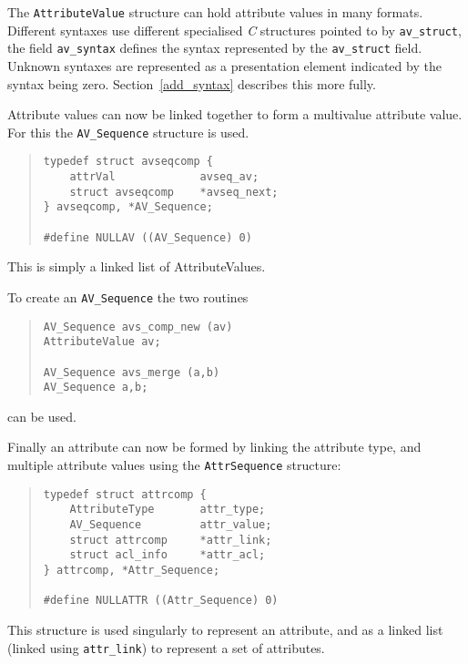 The \verb"AttributeValue" structure can hold attribute values in many
formats. Different syntaxes use different 
specialised {\em C\/} structures pointed to by
\verb"av_struct", the
field \verb"av_syntax" defines the syntax represented by the
\verb"av_struct" field.
Unknown syntaxes are represented as a presentation element
indicated by the syntax being zero.
Section~\ref{add_syntax} describes this more fully.


Attribute values can now be linked together to form a multivalue attribute
value.
For this the \verb"AV_Sequence" structure is used.

\begin{quote}\small\begin{verbatim}
typedef struct avseqcomp {     
    attrVal             avseq_av;
    struct avseqcomp    *avseq_next;
} avseqcomp, *AV_Sequence;

#define NULLAV ((AV_Sequence) 0)
\end{verbatim}\end{quote}

This is simply a linked list of AttributeValues.

To create an \verb"AV_Sequence" the two routines
\begin{quote}\small\begin{verbatim}
AV_Sequence avs_comp_new (av)
AttributeValue av;

AV_Sequence avs_merge (a,b)
AV_Sequence a,b;
\end{verbatim}\end{quote}
can be used.

Finally an attribute can now be formed by linking the attribute type, and
multiple attribute values using the \verb"AttrSequence" structure:

\begin{quote}\small\begin{verbatim}
typedef struct attrcomp {       
    AttributeType       attr_type;
    AV_Sequence         attr_value;
    struct attrcomp     *attr_link;
    struct acl_info     *attr_acl;
} attrcomp, *Attr_Sequence;

#define NULLATTR ((Attr_Sequence) 0)
\end{verbatim}\end{quote}

This structure is used singularly to represent an attribute, and as a linked
list (linked using \verb"attr_link") to represent a set of attributes.

